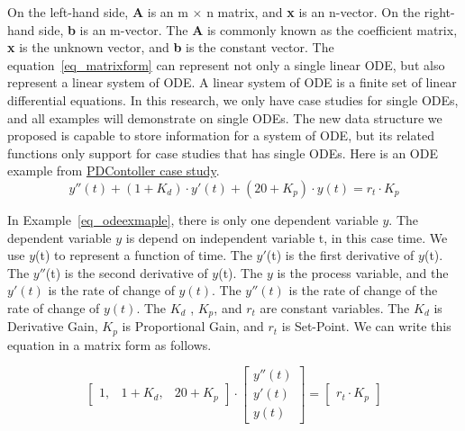 On the left-hand side, \textbf{A} is an m $\times$ n matrix, and \textbf{x} is an n-vector. On the right-hand side, \textbf{b} is an m-vector. The \textbf{A} is commonly known as the coefficient matrix, \textbf{x} is the unknown vector, and \textbf{b} is the constant vector. The equation~\ref{eq_matrixform} can represent not only a single linear ODE, but also represent a linear system of ODE. A linear system of ODE is a finite set of linear differential equations. In this research, we only have case studies for single ODEs, and all examples will demonstrate on single ODEs. The new data structure we proposed is capable to store information for a system of ODE, but its related functions only support for case studies that has single ODEs. Here is an ODE example from \href{https://jacquescarette.github.io/Drasil/examples/pdcontroller/SRS/srs/PDController_SRS.html#Sec:IMs}{PDContoller case study}.
\begin{equation} \label{eq_odeexmaple}
	y''(t) + (1 + K_d) \cdot y'(t) + (20 + K_p) \cdot y(t) = r_t \cdot K_p
\end{equation}

In Example~\ref{eq_odeexmaple}, there is only one dependent variable $y$. The dependent variable $y$ is depend on independent variable t, in this case time. We use $y$(t) to represent a function of time. The $y'$(t) is the first derivative of $y$(t). The $y''$(t) is the second derivative of $y$(t). The $y$ is the process variable, and the $y'(t)$ is the rate of change of $y(t)$. The $y''(t)$ is the rate of change of the rate of change of $y(t)$. The $K_d$ , $K_p$, and $r_t$ are constant variables. The $K_d$ is Derivative Gain, $K_p$ is Proportional Gain, and $r_t$ is Set-Point. We can write this equation in a matrix form as follows.

\begin{equation} \label{eq_matrixformexmaple}
	\begin{bmatrix}
		1, & 1 + K_{d}, & 20 + K_{p}
	\end{bmatrix}
	\cdot
	\begin{bmatrix}
		y''(t)  \\
		y'(t)   \\
		y(t)  
	\end{bmatrix}
	=
	\begin{bmatrix}
		r_{t} \cdot K_{p} 
	\end{bmatrix}
\end{equation}

